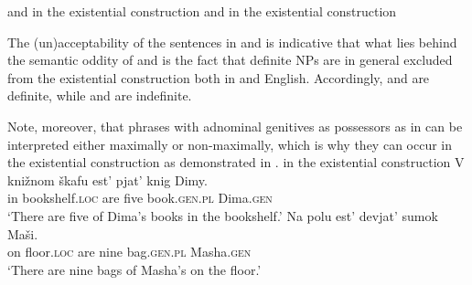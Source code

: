 \documentclass[output=paper]{langscibook}
\begin{document}
\ea \label{DE}  and  in the existential construction
\z\ex\label{DE2}  and  in the existential construction
\z\z

\noindent The (un)acceptability of the sentences in  and  is indicative that what lies behind the semantic oddity of  and  is the fact that definite NPs are in general excluded from the existential construction both in  and English. Accordingly,  and  are definite, while  and  are indefinite.

Note, moreover, that phrases with adnominal genitives as possessors as in  can be interpreted either maximally or non-maximally, which is why they can occur in the existential construction as demonstrated in .
    \ea\label{DE-GEN} in the existential construction
	\ea\label{DEgen}
	\gll	V {knižnom škafu} est' pjat' knig Dimy.\\
	    	in bookshelf.\textsc{loc} are five book.\textsc{gen.pl} Dima.\textsc{gen}\\
	\glt	`There are five of Dima's books in the bookshelf.'
	\ex\label{DEgen2}
	\gll	Na polu est' devjat' sumok Maši.\\
			on floor.\textsc{loc} are nine bag.\textsc{gen.pl} Masha.\textsc{gen}\\
	\glt	`There are nine bags of Masha's on the floor.'
	\z\z
\end{document}
